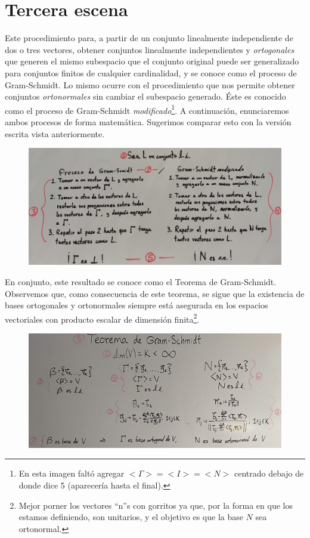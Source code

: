 \documentclass[12pt,dvipsnames]{article}
\numberwithin{equation}{section}
\begin{document}

\newpage
\section{Tercera escena}

Este procedimiento para, a partir de un conjunto linealmente independiente de dos o tres vectores, obtener conjuntos linealmente independientes y \emph{ortogonales} que generen el mismo subespacio que el conjunto original puede ser generalizado para conjuntos finitos de cualquier cardinalidad, y se conoce como el proceso de Gram-Schmidt. Lo mismo ocurre con el procedimiento que nos permite obtener conjuntos \emph{ortonormales} sin cambiar el subespacio generado. Éste es conocido como el proceso de Gram-Schmidt \emph{modificado}\footnote{En esta imagen faltó agregar $<\Gamma>=<I>=<N>$ centrado debajo de donde dice 5 (aparecería hasta el final).}. A continuación, enunciaremos ambos procesos de forma matemática. Sugerimos comparar esto con la versión escrita vista anteriormente. 

\begin{figure}[h!]
    \centering
    \includegraphics[width=16cm]{1.png}
\end{figure}

En conjunto, este resultado se conoce como el Teorema de Gram-Schmidt. Observemos que, como consecuencia de este teorema, se sigue que la existencia de bases ortogonales y ortonormales siempre está asegurada en los espacios vectoriales con producto escalar de dimensión finita\footnote{Mejor porner los vectores ``n''s con gorritos ya que, por la forma en que los estamos definiendo, son unitarios, y el objetivo es que la base $N$ sea ortonormal.}.

\begin{figure}[h!]
    \centering
    \includegraphics[width=16cm]{2.png}
\end{figure}
\end{document}
